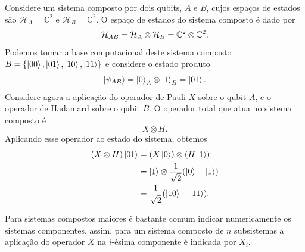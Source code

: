 \begin{example}
Considere um sistema composto por dois qubits, $A$ e $B$, cujos espaços de estados
são $\mathcal{H}_A = \mathbb{C}^2$ e $\mathcal{H}_B = \mathbb{C}^2$. O espaço
de estados do sistema composto é dado por
\begin{equation}
    \mathcal{H}_{AB} = \mathcal{H}_A \otimes \mathcal{H}_B = \mathbb{C}^2\otimes \mathbb{C}^2.
\end{equation}
Podemos tomar a base computacional deste sistema composto $B=\{\ket{00}, \ket{01}, \ket{10}, \ket{11}\}$ e considere o estado produto
\begin{equation}
\ket{\psi_{AB}} = \ket{0}_A \otimes \ket{1}_B = \ket{01}.
\end{equation}
Considere agora a aplicação do operador de Pauli $X$ sobre o qubit $A$, e o operador de Hadamard sobre o qubit $B$. O operador total que atua no sistema composto é
\begin{equation}
X \otimes H.
\end{equation}
Aplicando esse operador ao estado do sistema, obtemos
\begin{align}
(X \otimes H)\ket{01}
&= (X\ket{0}) \otimes (H\ket{1}) \\
&= \ket{1} \otimes \frac{1}{\sqrt{2}}(\ket{0} - \ket{1}) \\
&= \frac{1}{\sqrt{2}}(\ket{10}-\ket{11}).
\end{align}
\end{example}

Para sistemas compostos maiores é bastante comum indicar numericamente os sistemas componentes, assim, para um sistema composto de $n$ subsistemas a aplicação do operador $X$ na $i$-ésima componente é indicada por $X_i$.